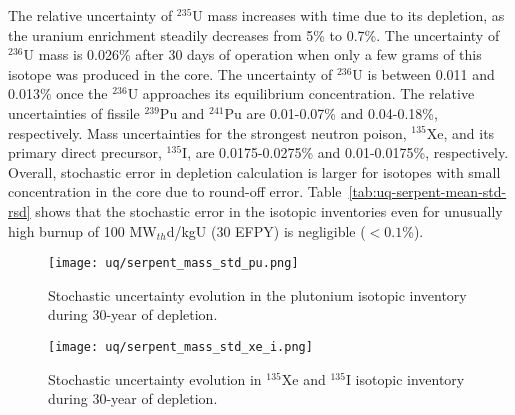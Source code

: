 The relative uncertainty of $^{235}$U mass increases with time due to its 
depletion, as the uranium enrichment steadily decreases from 5\% to 0.7\%.
The uncertainty of $^{236}$U mass is 
0.026\% after 30 days of operation when only a few grams of this isotope was 
produced in the core. The uncertainty of $^{236}$U is between 0.011  and 
0.013\% once the $^{236}$U approaches its equilibrium concentration. The 
relative uncertainties of fissile $^{239}$Pu and $^{241}$Pu are 0.01-0.07\% 
and 0.04-0.18\%, respectively. Mass uncertainties for the 
strongest neutron poison, $^{135}$Xe, and its primary direct precursor, 
$^{135}$I, are 0.0175-0.0275\% and 0.01-0.0175\%, respectively. Overall, 
stochastic error in depletion calculation is larger for isotopes with small 
concentration in the core due to round-off error. 
Table~\ref{tab:uq-serpent-mean-std-rsd} shows that the stochastic error in the 
isotopic inventories even for unusually high burnup of 100 MW$_{th}$d/kgU (30 
\gls{EFPY}) is negligible ($<0.1$\%).

\begin{figure}[htp!] %
	\centering
	\texttt{[image: uq/serpent\_mass\_std\_pu.png]}
	\vspace{-3mm}
	\caption{Stochastic uncertainty evolution in the plutonium isotopic 
		inventory during 30-year of depletion.}
	\label{fig:uq-serpent-pu}
\end{figure}
	\vspace{-9mm}
\begin{figure}[hbp!] %
	\centering
	\texttt{[image: uq/serpent\_mass\_std\_xe\_i.png]}
		\vspace{-3mm}
	\caption{Stochastic uncertainty evolution in $^{135}$Xe and $^{135}$I 
	isotopic inventory during 30-year of depletion.}
	\label{fig:uq-serpent-xe-i}
\end{figure}



